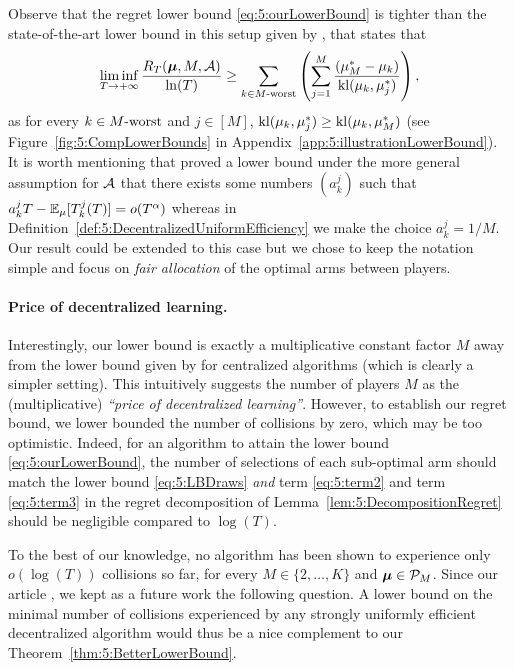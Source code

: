 Observe that the regret lower bound \eqref{eq:5:ourLowerBound} is tighter than the state-of-the-art lower bound in this setup
given by \cite{Zhao10}, that states that
\begin{equation}\label{eq:5:Zhao10LowerBound}
  \mathop{\lim\inf}\limits_{T \to +\infty} \frac{R_T(\boldsymbol{\mu}, M, \mathcal{A})}{\ln(T)}
  \geq \sum_{k \in M\text{-}\mathrm{worst}} \left( \sum_{j=1}^{M} \frac{(\mu_M^* -  \mu_k)}{\mathrm{kl}(\mu_k, \mu_{j}^*)} \right),
\end{equation}
as for every $k \in M\text{-}\mathrm{worst}$ and $j \in [M]$, $\mathrm{kl}(\mu_k, \mu_j^*) \geq \mathrm{kl}(\mu_k, \mu_M^*)$
(see Figure~\ref{fig:5:CompLowerBounds} in Appendix~\ref{app:5:illustrationLowerBound}).
%
It is worth mentioning that \cite{Zhao10} proved a lower bound under the more general assumption for $\mathcal{A}$ that there exists some numbers $(a_{k}^j)$ such that $a_{k}^j T - \mathbb{E}_{\mu}[T_k^j(T)] = o(T^\alpha)$ whereas in Definition~\ref{def:5:DecentralizedUniformEfficiency} we make the choice $a_{k}^j = 1/M$.
Our result could be extended to this case but we chose to keep the notation simple and focus on \emph{fair allocation} of the optimal arms between players.


\paragraph{Price of decentralized learning.}
%
Interestingly, our lower bound is exactly a multiplicative constant factor $M$ away from the lower bound given by \cite{Anantharam87a} for centralized algorithms (which is clearly a simpler setting). This intuitively suggests the number of players $M$ as the (multiplicative) \emph{``price of decentralized learning''}. However, to establish our regret bound, we lower bounded the number of collisions by zero, which may be too optimistic.
%
Indeed, for an algorithm to attain the lower bound \eqref{eq:5:ourLowerBound}, the number of selections of each sub-optimal arm should match the lower bound \eqref{eq:5:LBDraws} \emph{and} term \ref{eq:5:term2} and term \ref{eq:5:term3} in the regret decomposition of Lemma~\ref{lem:5:DecompositionRegret} should be negligible compared to  $\log(T)$.

To the best of our knowledge, no algorithm has been shown to experience only $o(\log(T))$ collisions so far,
for every $M \in \{2,\dots,K\}$ and $\boldsymbol{\mu} \in \mathcal{P}_M$.
%
Since our article \cite{Besson2018ALT}, we kept as a future work the following question.
A lower bound on the minimal number of collisions experienced by any strongly uniformly efficient decentralized algorithm would thus be a nice complement to our Theorem~\ref{thm:5:BetterLowerBound}.


